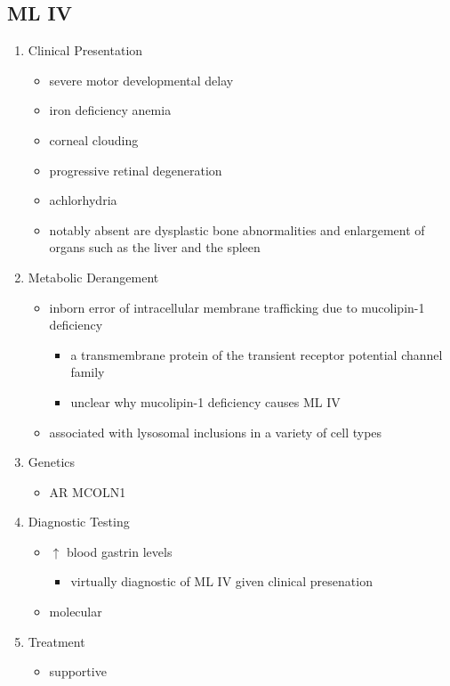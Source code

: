 \documentclass{scrartcl}
\begin{document}
\subsection{ML IV}
\label{sec:org4849df9}
\begin{enumerate}
\item Clinical Presentation
\label{sec:orgdcb689a}
\begin{itemize}
\item severe motor developmental delay
\item iron deficiency anemia
\item corneal clouding
\item progressive retinal degeneration
\item achlorhydria
\end{itemize}
\begin{itemize}
\item notably absent are dysplastic bone abnormalities and enlargement of
organs such as the liver and the spleen
\end{itemize}

\item Metabolic Derangement
\label{sec:orgb6c70d7}
\begin{itemize}
\item inborn error of intracellular membrane trafficking due to mucolipin-1 deficiency
\begin{itemize}
\item a transmembrane protein of the transient receptor potential channel family
\item unclear why  mucolipin-1 deficiency causes ML IV
\end{itemize}
\item associated with lysosomal inclusions in a variety of cell types
\end{itemize}
\item Genetics
\label{sec:org4c5cb96}
\begin{itemize}
\item AR MCOLN1
\end{itemize}
\item Diagnostic Testing
\label{sec:org5367af8}
\begin{itemize}
\item \(\uparrow\) blood gastrin levels
\begin{itemize}
\item virtually diagnostic of ML IV given clinical presenation
\end{itemize}
\item molecular
\end{itemize}

\item Treatment
\label{sec:orgfd692c9}
\begin{itemize}
\item supportive
\end{itemize}
\end{enumerate}
\end{document}
